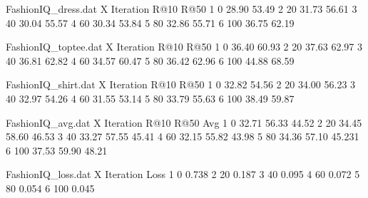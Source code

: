 \begin{filecontents}{FashionIQ_dress.dat}
X Iteration     R@10        R@50                
1 0	            28.90       53.49                 
2 20            31.73       56.61               	
3 40		    30.04       55.57     
4 60            30.34       53.84     	    
5 80            32.86       55.71     	    
6 100           36.75       62.19     	    
\end{filecontents}
\begin{filecontents}{FashionIQ_toptee.dat}
X Iteration     R@10        R@50                
1 0	            36.40       60.93                 
2 20            37.63       62.97               	
3 40		    36.81       62.82     
4 60            34.57       60.47     	    
5 80            36.42       62.96     	    
6 100           44.88       68.59     	    
\end{filecontents}
\begin{filecontents}{FashionIQ_shirt.dat}
X Iteration     R@10        R@50                
1 0	            32.82       54.56                 
2 20            34.00       56.23               	
3 40		    32.97       54.26     
4 60            31.55       53.14     	    
5 80            33.79       55.63     	    
6 100           38.49       59.87     	    
\end{filecontents}
\begin{filecontents}{FashionIQ_avg.dat}
X Iteration     R@10    R@50    Avg                     
1 0	            32.71   56.33   44.52                       
2 20            34.45   58.60   46.53                   	
3 40		    33.27   57.55   45.41        
4 60            32.15   55.82   43.98        	    
5 80            34.36   57.10   45.231        	    
6 100           37.53   59.90   48.21        	    
\end{filecontents}
\begin{filecontents}{FashionIQ_loss.dat}
X Iteration    Loss           
1 0	          0.738       
2 20          0.187      
3 40		  0.095       
4 60          0.072      
5 80          0.054       
6 100         0.045       
\end{filecontents}

